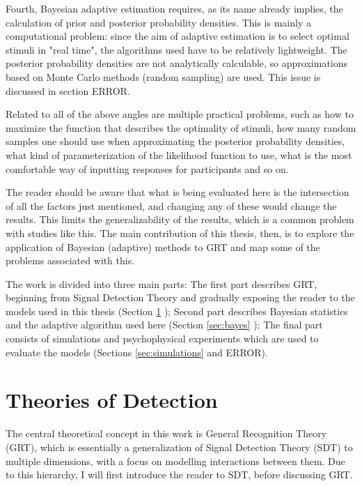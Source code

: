 \documentclass{article}\usepackage{knitr}
\begin{document}
Fourth, Bayesian adaptive estimation requires, as its name already implies, the calculation of prior and posterior probability densities. This is mainly a computational problem: since the aim of adaptive estimation is to select optimal stimuli in "real time", the algorithms used have to be relatively lightweight. The posterior probability densities are not analytically calculable, so approximations based on Monte Carlo methods (random sampling) are used. This issue is discussed in section ERROR.

Related to all of the above angles are multiple practical problems, such as how to maximize the function that describes the optimality of stimuli, how many random samples one should use when approximating the posterior probability densities, what kind of parameterization of the likelihood function to use, what is the most comfortable way of inputting responses for participants and so on. 

The reader should be aware that what is being evaluated here is the intersection of all the factors just mentioned, and changing any of these would change the results. This limits the generalizability of the results, which is a common problem with studies like this. The main contribution of this thesis, then, is to explore the application of Bayesian (adaptive) methods to GRT and map some of the problems associated with this.

The work is divided into three main parts: The first part describes GRT, beginning from Signal Detection Theory and gradually exposing the reader to the models used in this thesis (Section \ref{sec:GRT} \textit{}); Second part describes Bayesian statistics and the adaptive algorithm used here (Section \ref{sec:bayes} \textit{}); The final part consists of simulations and psychophysical experiments which are used to evaluate the models (Sections \ref{sec:simulations} \textit{} and ERROR).

\newpage


\section{Theories of Detection}
\label{sec:GRT}

The central theoretical concept in this work is General Recognition Theory (GRT), which is essentially a generalization of Signal Detection Theory (SDT) to multiple dimensions, with a focus on modelling interactions between them. Due to this hierarchy, I will first introduce the reader to SDT, before discussing GRT.
\end{document}
